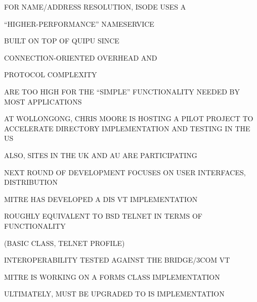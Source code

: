 \begin{bwslide}

\begin{nrtc}
\item	FOR NAME/ADDRESS RESOLUTION, ISODE USES A 
    \begin{nrtc}
    \item	``HIGHER-PERFORMANCE'' NAMESERVICE
    \end{nrtc}
    BUILT ON TOP OF QUIPU SINCE
    \begin{nrtc}
    \item	CONNECTION-ORIENTED OVERHEAD AND

    \item	PROTOCOL COMPLEXITY
    \end{nrtc}
    ARE TOO HIGH FOR THE ``SIMPLE'' FUNCTIONALITY NEEDED BY MOST APPLICATIONS

\item	AT WOLLONGONG, CHRIS MOORE IS HOSTING A PILOT PROJECT TO
	ACCELERATE DIRECTORY IMPLEMENTATION AND TESTING IN THE US
    \begin{nrtc}
    \item	ALSO, SITES IN THE UK AND AU ARE PARTICIPATING
    \end{nrtc}

\item	NEXT ROUND OF DEVELOPMENT FOCUSES ON USER INTERFACES, DISTRIBUTION
\end{nrtc}
\end{bwslide}


\begin{bwslide}

\begin{nrtc}
\item	MITRE HAS DEVELOPED A DIS VT IMPLEMENTATION

\item	ROUGHLY EQUIVALENT TO BSD TELNET IN TERMS OF FUNCTIONALITY
    \begin{nrtc}
    \item	(BASIC CLASS, TELNET PROFILE)
    \end{nrtc}

\item	INTEROPERABILITY TESTED AGAINST THE BRIDGE/3COM VT

\item	MITRE IS WORKING ON A FORMS CLASS IMPLEMENTATION

\item	ULTIMATELY, MUST BE UPGRADED TO IS IMPLEMENTATION
\end{nrtc}
\end{bwslide}


